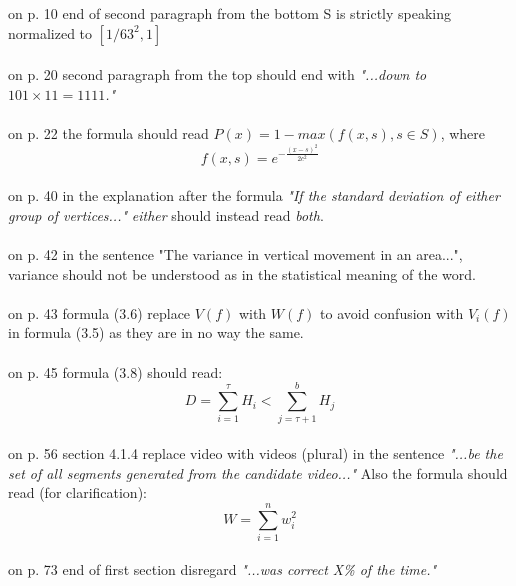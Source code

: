 \documentclass[12pt]{report}
\begin{document}
%
\noindent
on p. 10 end of second paragraph from the bottom S is strictly speaking normalized to $[1/63^2,1]$
\\\\
on p. 20 second paragraph from the top should end with \textit{"...down to $101 \times 11 = 1111$."}
\\\\
on p. 22 the formula should read $P(x) = 1 - max(f(x,s), s \in S)$, where 
\[
f(x,s)=e^{-\frac{(x-s)^{2}}{2c^{2}}}
\]
\\
on p. 40 in the explanation after the formula \textit{"If the standard deviation of either group of vertices..."} \textit{either} should instead read \textit{both}.
\\\\
on p. 42 in the sentence "The variance in vertical movement in an area...", variance should not be understood as in the statistical meaning of the word.
\\\\
on p. 43 formula (3.6) replace $V(f)$ with $W(f)$ to avoid confusion with $V_i(f)$ in formula (3.5) as they are in no way the same.
\\\\
on p. 45 formula (3.8) should read:
\[
D=\sum_{i=1}^{\tau}H_i < \sum_{j=\tau+1}^{b}H_j
\]
\\
on p. 56 section 4.1.4 replace video with videos (plural) in the sentence \textit{"...be the set of all segments generated from the candidate video..."}
Also the formula should read (for clarification):
\[
W = \sum_{i=1}^n w_i^2
\]
\\
on p. 73 end of first section disregard \textit{"...was correct X\% of the time."}
%
\end{document}
